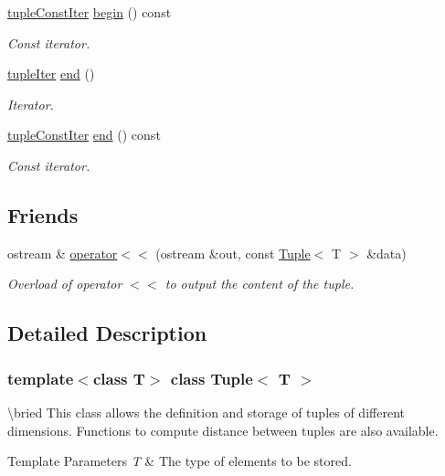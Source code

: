 \begin{DoxyCompactItemize}
\mbox{\hyperlink{maths_8hh_a2eba794860251c1b30e532df32ee4d1b}{tuple\+Const\+Iter}} \mbox{\hyperlink{class_tuple_ab5d618dac69995db6adb0e657cd73bb3}{begin}} () const
\begin{DoxyCompactList}\small\item\em Const iterator. \end{DoxyCompactList}\item 
\mbox{\hyperlink{maths_8hh_ad22dcdeefda7d41523cc1604953eb6cc}{tuple\+Iter}} \mbox{\hyperlink{class_tuple_a345d8a3efbf58fe4cc7295c3cf66e8ab}{end}} ()
\begin{DoxyCompactList}\small\item\em Iterator. \end{DoxyCompactList}\item 
\mbox{\hyperlink{maths_8hh_a2eba794860251c1b30e532df32ee4d1b}{tuple\+Const\+Iter}} \mbox{\hyperlink{class_tuple_ac55a72437773f17dd8fbccf866d7e7eb}{end}} () const
\begin{DoxyCompactList}\small\item\em Const iterator. \end{DoxyCompactList}\end{DoxyCompactItemize}
\subsection*{Friends}
\begin{DoxyCompactItemize}
\item 
ostream \& \mbox{\hyperlink{class_tuple_a2e6e2a2521038ab827ff2aa73023a53d}{operator$<$$<$}} (ostream \&out, const \mbox{\hyperlink{class_tuple}{Tuple}}$<$ T $>$ \&data)
\begin{DoxyCompactList}\small\item\em Overload of operator $<$$<$ to output the content of the tuple. \end{DoxyCompactList}\end{DoxyCompactItemize}


\subsection{Detailed Description}
\subsubsection*{template$<$class T$>$\newline
class Tuple$<$ T $>$}

\textbackslash{}bried This class allows the definition and storage of tuples of different dimensions. Functions to compute distance between tuples are also available. 
\begin{DoxyTemplParams}{Template Parameters}
{\em T} & The type of elements to be stored. \\
\hline
\end{DoxyTemplParams}



